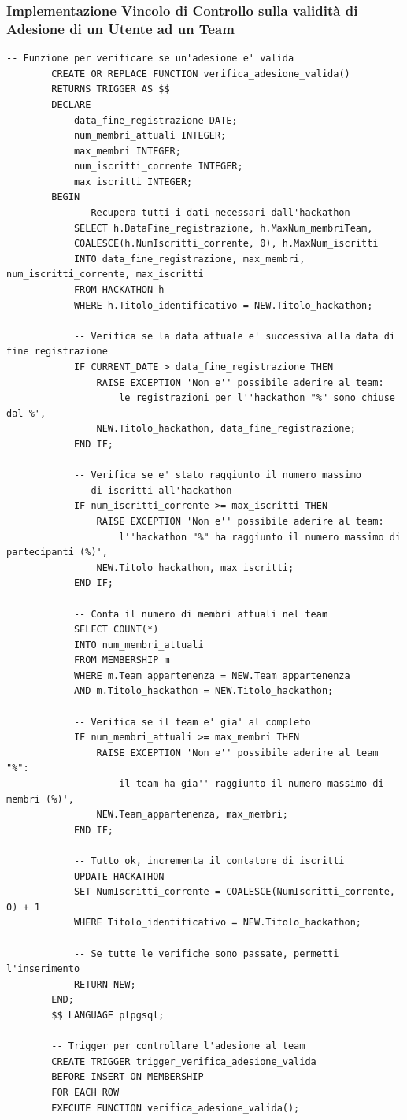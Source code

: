 \documentclass[a4paper, 10pt]{article}
\begin{document}
	\subsubsection{Implementazione Vincolo di Controllo sulla validità di Adesione di un Utente ad un Team}
	\begin{lstlisting}[style=sqlstyle]
		-- Funzione per verificare se un'adesione e' valida
		CREATE OR REPLACE FUNCTION verifica_adesione_valida()
		RETURNS TRIGGER AS $$
		DECLARE
			data_fine_registrazione DATE;
			num_membri_attuali INTEGER;
			max_membri INTEGER;
			num_iscritti_corrente INTEGER;
			max_iscritti INTEGER;
		BEGIN
			-- Recupera tutti i dati necessari dall'hackathon
			SELECT h.DataFine_registrazione, h.MaxNum_membriTeam, 
			COALESCE(h.NumIscritti_corrente, 0), h.MaxNum_iscritti
			INTO data_fine_registrazione, max_membri, num_iscritti_corrente, max_iscritti
			FROM HACKATHON h
			WHERE h.Titolo_identificativo = NEW.Titolo_hackathon;
			
			-- Verifica se la data attuale e' successiva alla data di fine registrazione
			IF CURRENT_DATE > data_fine_registrazione THEN
				RAISE EXCEPTION 'Non e'' possibile aderire al team: 
					le registrazioni per l''hackathon "%" sono chiuse dal %',
				NEW.Titolo_hackathon, data_fine_registrazione;
			END IF;
			
			-- Verifica se e' stato raggiunto il numero massimo 
			-- di iscritti all'hackathon
			IF num_iscritti_corrente >= max_iscritti THEN
				RAISE EXCEPTION 'Non e'' possibile aderire al team: 
					l''hackathon "%" ha raggiunto il numero massimo di partecipanti (%)',
				NEW.Titolo_hackathon, max_iscritti;
			END IF;
			
			-- Conta il numero di membri attuali nel team
			SELECT COUNT(*)
			INTO num_membri_attuali
			FROM MEMBERSHIP m
			WHERE m.Team_appartenenza = NEW.Team_appartenenza
			AND m.Titolo_hackathon = NEW.Titolo_hackathon;
			
			-- Verifica se il team e' gia' al completo
			IF num_membri_attuali >= max_membri THEN
				RAISE EXCEPTION 'Non e'' possibile aderire al team "%": 
					il team ha gia'' raggiunto il numero massimo di membri (%)',
				NEW.Team_appartenenza, max_membri;
			END IF;
			
			-- Tutto ok, incrementa il contatore di iscritti
			UPDATE HACKATHON
			SET NumIscritti_corrente = COALESCE(NumIscritti_corrente, 0) + 1
			WHERE Titolo_identificativo = NEW.Titolo_hackathon;
			
			-- Se tutte le verifiche sono passate, permetti l'inserimento
			RETURN NEW;
		END;
		$$ LANGUAGE plpgsql;
		
		-- Trigger per controllare l'adesione al team
		CREATE TRIGGER trigger_verifica_adesione_valida
		BEFORE INSERT ON MEMBERSHIP
		FOR EACH ROW
		EXECUTE FUNCTION verifica_adesione_valida();
	\end{lstlisting}
\end{document}
